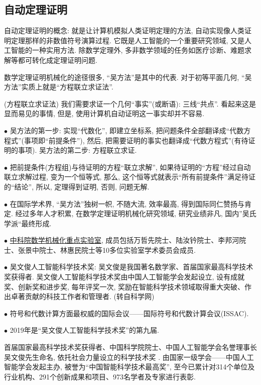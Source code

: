 \subsection{自动定理证明}
自动定理证明的概念: 就是让计算机模拟人类证明定理的方法, 自动实现像人类证明定理那样的非数值符号演算过程. 它既是人工智能的一个重要研究领域, 又是人工智能的一种实用方法.
除数学定理外, 多非数学领域的任务如医疗诊断、难题求解等都可转化成定理证明问题.
\begin{remark}
数学定理证明机械化的途径很多, “吴方法”是其中的代表. 对于初等平面几何, “吴方法”实质上就是“方程联立求证法”.
\begin{example}(方程联立求证法)
  我们需要求证一个几何“事实”(或断语): 三线“共点”. 看起来这是显而易见的事情, 但是, 使用计算机自动证明这一事实却并不容易.
\end{example}

$\bullet$ 吴方法的第一步: 实现“代数化”, 即建立坐标系, 把问题条件全部翻译成“代数方程式”(事项即“前提条件”), 然后, 把需要证明的事实也翻译成“代数方程式”(有待证明的事项). 吴方法的第二步: 方程联立求证.

$\bullet$ 把前提条件(方程组)与待证明的方程“联立求解”, 如果待证明的“方程”经过自动联立求解过程, 变为一个恒等式, 那么, 这个恒等式就表示“所有前提条件”满足待证的“结论”, 所以, 定理得到证明, 否则, 问题无解.

$\bullet$ 在国际学术界, “吴方法”独树一帜, 不随大流, 效率最高, 得到国际同仁赞扬与肯定. 经过多年人才积累, 在数学定理证明机械化研究领域, 研究业绩非凡, 国内”吴氏学派“最终形成.

$\bullet$ \href{http://www.mmrc.iss.ac.cn/}{中科院数学机械化重点实验室},  成员包括万哲先院士、陆汝钤院士、李邦河院士、张景中院士、林惠民院士等10多位实验室学术委员会成员.

$\bullet$ 吴文俊人工智能科学技术奖:  吴文俊是我国著名数学家、首届国家最高科学技术奖获得者. 吴文俊人工智能科学技术奖由中国人工智能学会发起设立, 设有成就奖、创新奖和进步奖, 每年评奖一次, 奖励在智能科学技术领域取得重大突破、作出卓著贡献的科技工作者和管理者. (转自科学网)

$\bullet$ 符号和代数计算方面最权威的国际会议——国际符号和代数计算会议(ISSAC).

$\bullet$  2019年是“吴文俊人工智能科学技术奖”的第九届.
\end{remark}

\begin{remark}
首届国家最高科学技术奖获得者、中国科学院院士、中国人工智能学会名誉理事长吴文俊先生命名, 依托社会力量设立的科学技术奖 . 由国家一级学会——中国人工智能学会发起主办, 被誉为“中国智能科学技术最高奖”, 至今已累计对314个单位及行业机构、291个创新成果和项目、973名学者及专家进行表彰.
\end{remark}

